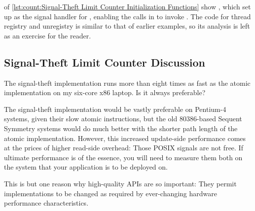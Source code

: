 \begin{listing}

\caption{Signal-Theft Limit Counter Initialization Functions}
\label{lst:count:Signal-Theft Limit Counter Initialization Functions}
\end{listing}

\begin{fcvref}
 of
\cref{lst:count:Signal-Theft Limit Counter Initialization Functions}
show , which set up 
as the signal handler for ,
enabling the  calls in 
to invoke .
The code for thread registry and unregistry is similar to that of
earlier examples, so its analysis is left as an exercise for the
reader.
\end{fcvref}

\subsection{Signal-Theft Limit Counter Discussion}

The signal-theft implementation runs more than eight times as fast as the
atomic implementation on my six-core x86 laptop.
Is it always preferable?

The signal-theft implementation would be vastly preferable on Pentium-4
systems, given their slow atomic instructions, but the old 80386-based
Sequent Symmetry systems would do much better with the shorter path
length of the atomic implementation.
However, this increased update-side performance comes at the
prices of higher read-side overhead:
Those POSIX signals are not free.
If ultimate performance is of the essence, you will need to measure
them both on the system that your application is to be deployed on.

\QuickQuizEnd

This is but one reason why high-quality APIs are so important:
They permit implementations to be changed as required by ever-changing
hardware performance characteristics.


